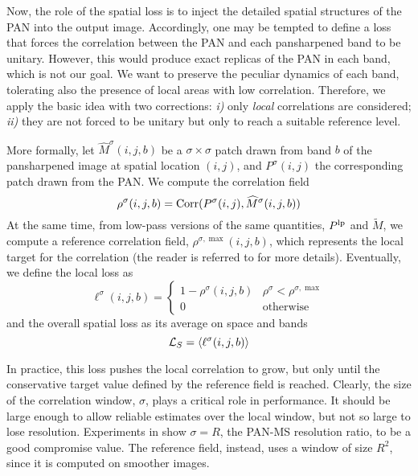 \documentclass[journal]{IEEEtran}
\newcommand{\hM} {\widehat{M}}
\newcommand{\LL}{{\cal L}}
\begin{document}
Now, the role of the spatial loss is to inject the detailed spatial structures of the PAN into the output image.
Accordingly, one may be tempted to define a loss that forces the correlation between the PAN and each pansharpened band to be unitary.
However, this would produce exact replicas of the PAN in each band, which is not our goal.
We want to preserve the peculiar dynamics of each band, tolerating also the presence of local areas with low correlation.
Therefore, we apply the basic idea with two corrections:
{\it  i)} only {\em local} correlations are considered;
{\it ii)} they are not forced to be unitary but only to reach a suitable reference level.

More formally, let
$\hM^\sigma(i,j,b)$ be a $\sigma\times\sigma$ patch drawn from band $b$ of the pansharpened image at spatial location $(i,j)$, and
$P^\sigma(i,j)$ the corresponding patch drawn from the PAN.
We compute the correlation field
\begin{equation}
    \rho^\sigma(i,j,b) = {\rm Corr}(P^\sigma(i,j),\hM^\sigma(i,j,b))
\end{equation}
At the same time, from low-pass versions of the same quantities, $P^{\rm lp}$ and $\widetilde{M}$,
we compute a reference correlation field, $\rho^{\sigma,\max}(i,j,b)$, which represents the local target for the correlation (the reader is referred to \cite{Ciotola2022} for more details).
Eventually, we define the local loss as
\begin{equation}
    \ell^\sigma(i,j,b) = \left\{ \begin{array}{ll}
            1-\rho^\sigma(i,j,b) & \rho^\sigma < \rho^{\sigma,\max} \\
            0                    & \mbox{otherwise}
            \end{array} \right.
\end{equation}
and the overall spatial loss as its average on space and bands
\begin{equation}
    \LL_S = \langle \ell^\sigma(i,j,b) \rangle
    \label{eq:ls-mean}
\end{equation}

In practice, this loss pushes the local correlation to grow, but only until the conservative target value defined by the reference field is reached.
Clearly, the size of the correlation window, $\sigma$, plays a critical role in performance.
It should be large enough to allow reliable estimates over the local window, but not so large to lose resolution.
Experiments in \cite{Ciotola2022} show $\sigma=R$, the PAN-MS resolution ratio, to be a good compromise value.
The reference field, instead, uses a window of size $R^2$, since it is computed on smoother images.
\end{document}
